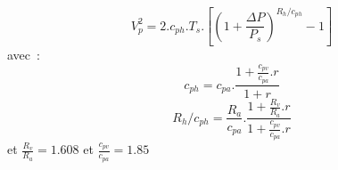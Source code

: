 \[
V_p^2 = 2.c_{ph}.T_s.
        \left[ \left(1+\frac{\Delta P}{P_s}\right)^{R_h/c_{ph} } -1 \right]
\]
avec~:\\
\[
c_{ph} = c_{pa} . \frac{1 + \frac{c_{pv}}{c_{pa}}.r}{1 + r}
\]
\[
R_h/c_{ph} = \frac{R_a}{c_{pa}} . \frac{1 + \frac{R_v}{R_a}.r}
                                       {1+\frac{c_{pv}}{c_{pa}}.r }
\]
et $\frac{R_v}{R_a} = 1.608$ et $\frac{c_{pv}}{c_{pa}} = 1.85$
